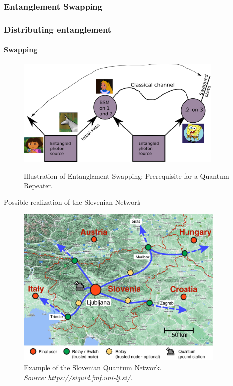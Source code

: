 \documentclass[serif,8pt]{beamer}
\begin{document}
\subsubsection{Entanglement Swapping}
\begin{frame}[t]
    \frametitle{Distributing entanglement}
    \framesubtitle{Swapping}
\begin{figure}[]
      \centering
      \caption{Illustration of Entanglement Swapping: Prerequisite for a Quantum Repeater.}
      \includegraphics[width=10cm]{EntanglementSwapping.png}
	\label{fig:Swap}
    \end{figure}
\end{frame}

\begin{frame}[t]{Possible realization of the Slovenian Network}
	\begin{figure}
		\begin{center}
			\includegraphics[width=0.9\textwidth]{SI_network_with_groundstation.jpg}
		\end{center}
		\caption{Example of the Slovenian Quantum Network.\\\textit{Source: \url{https://siquid.fmf.uni-lj.si/}.}}
	\end{figure}
\end{frame}
\end{document}
